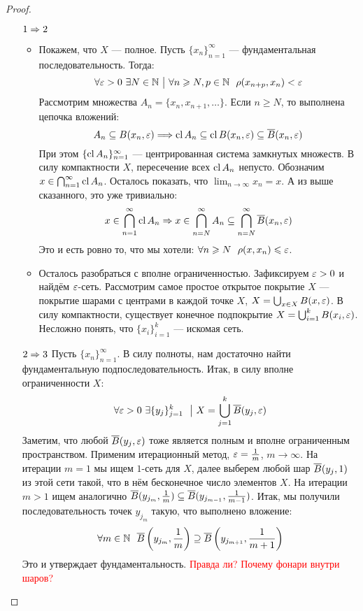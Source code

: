 \begin{proof}~
	\begin{enumerate}
		\item[$1 \Rightarrow 2$] 
		\begin{itemize}
			\item Покажем, что $X$ --- полное. Пусть $\{x_n\}_{n = 1}^\infty$ --- фундаментальная последовательность. Тогда:
			\[
				\forall \varepsilon > 0\ \exists N \in \mathbb{N} \ \big|\  \forall n \geqslant N, p \in \mathbb{N}\ \ \rho(x_{n + p}, x_n) < \varepsilon
			\]
			Рассмотрим множества $A_n = \{x_n, x_{n + 1}, \ldots\}$. Если $n \ge N$, то выполнена цепочка вложений:
			\[
				A_n \subseteq B(x_n, \varepsilon) \Longrightarrow \operatorname{cl} A_n \subseteq \operatorname{cl} B(x_n, \varepsilon) \subseteq \overline{B}(x_n, \varepsilon)
			\]
			При этом $\{\operatorname{cl} A_n\}_{n = 1}^\infty$ --- центрированная система замкнутых множеств. В силу компактности $X$, пересечение всех $\operatorname{cl} A_n$ непусто. Обозначим $x \in \bigcap_{n = 1}^\infty \operatorname{cl} A_n$. Осталось показать, что $\lim_{n \to \infty} x_n = x$. А из выше сказанного, это уже тривиально:
			\[
				x \in \bigcap_{n = 1}^\infty \operatorname{cl} A_n \Rightarrow x \in \bigcap_{n = N}^\infty A_n \subseteq \bigcap_{n = N}^\infty \overline{B}(x_n, \varepsilon)
			\]
			Это и есть ровно то, что мы хотели: $\forall n \ge N\ \ \rho(x, x_n) \le \eps$.
			
			\item Осталось разобраться с вполне ограниченностью. Зафиксируем $\varepsilon > 0$ и найдём $\varepsilon$-сеть. Рассмотрим самое простое открытое покрытие $X$ --- покрытие шарами с центрами в каждой точке $X$, $X = \bigcup_{x \in X} B(x, \varepsilon)$. В силу компактности, существует конечное подпокрытие $X = \bigcup_{i = 1}^k B(x_i, \varepsilon)$. Несложно понять, что $\{x_i\}_{i = 1}^k$ --- искомая сеть.
		\end{itemize}
	
		\item[$2 \Rightarrow 3$] Пусть $\{x_n\}_{n = 1}^\infty$. В силу полноты, нам достаточно найти фундаментальную подпоследовательность.  Итак, в силу вполне ограниченности $X$:
		\[
			\forall \varepsilon > 0\ \exists \{y_j\}_{j = 1}^k\ \ \big|\  X = \bigcup_{j = 1}^k \overline{B}(y_j, \varepsilon)
		\]
		Заметим, что любой $\overline{B}(y_j, \varepsilon)$ тоже является полным и вполне ограниченным пространством. Применим итерационный метод, $\varepsilon = \frac{1}{m}$, $m \to \infty$. На итерации $m = 1$ мы ищем $1$-сеть для $X$, далее выберем любой шар $\overline{B}(y_j, 1)$ из этой сети такой, что в нём бесконечное число элементов $X$. На итерации $m > 1$ ищем аналогично $\overline{B}(y_{j_m}, \frac{1}{m}) \subseteq \overline{B}(y_{j_{m - 1}}, \frac{1}{m - 1})$.  Итак, мы получили последовательность точек $y_{j_m}$ такую, что выполнено вложение:
		\[
			\forall m \in \mathbb{N}\ \ \overline{B}\left(y_{j_m}, \frac{1}{m}\right) \supseteq \overline{B}\left(y_{j_{m + 1}}, \frac{1}{m + 1}\right)
		\]
		Это и утверждает фундаментальность. \textcolor{red}{Правда ли? Почему фонари внутри шаров?}
		

\end{enumerate}
\end{proof}
